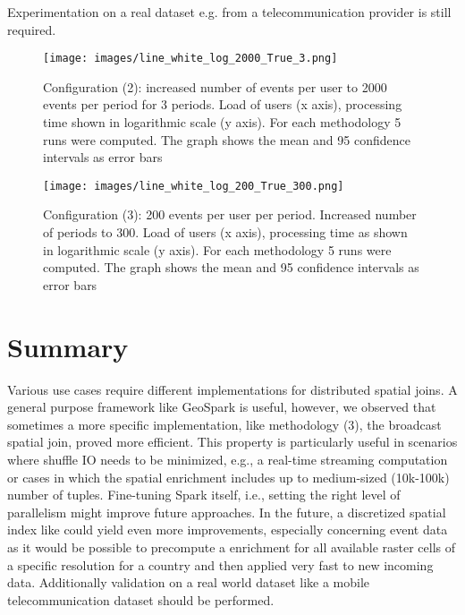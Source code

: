 \documentclass[conference]{IEEEtran}
\begin{document}
Experimentation on a real dataset e.g. from a telecommunication provider is still required.

\begin{figure}%
\centerline{\texttt{[image: images/line\_white\_log\_2000\_True\_3.png]}}
\caption{Configuration (2): increased number of events per user to 2000 events per period for 3 periods. Load of users (x axis), processing time shown in logarithmic scale (y axis). For each methodology 5 runs were computed. The graph shows the mean and 95 confidence intervals as error bars}
\label{fig:more_events}
\end{figure}
\begin{figure}%
\centerline{\texttt{[image: images/line\_white\_log\_200\_True\_300.png]}}
\caption{Configuration (3): 200 events per user per period. Increased number of periods to 300. Load of users (x axis), processing time as shown in logarithmic scale (y axis). For each methodology 5 runs were computed. The graph shows the mean and 95 confidence intervals as error bars}
\label{fig:more_periods}
\end{figure}

\section{Summary}
Various use cases require different implementations for distributed spatial joins.
A general purpose framework like GeoSpark is useful, however, we observed that sometimes a more specific implementation, like methodology (3), the broadcast spatial join, proved more efficient.
This property is particularly useful in scenarios where shuffle IO needs to be minimized, e.g., 
 a real-time streaming computation or cases in which the spatial enrichment includes up to medium-sized (10k-100k) number of tuples.
Fine-tuning Spark itself, i.e., setting the right level of parallelism might improve future approaches.
In the future, a discretized spatial index like \cite{uber_h3} could yield even more improvements, especially concerning event data as it would be possible to precompute a  enrichment for all available raster cells of a specific resolution for a country and then applied very fast to new incoming data.
Additionally validation on a real world dataset like a mobile telecommunication dataset should be performed.

\printbibliography
\end{document}
